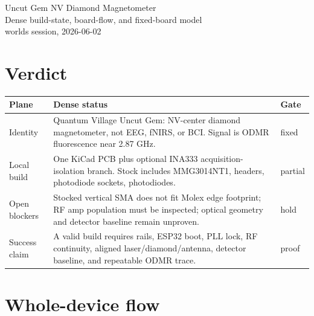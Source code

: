 \documentclass[10pt]{article}
\begin{document}
\begin{center}
{\Large Uncut Gem NV Diamond Magnetometer}\\
{\normalsize Dense build-state, board-flow, and fixed-board model}\\
worlds session, 2026-06-02
\end{center}

\section*{Verdict}

\begin{center}\small
\begin{tabular}{|L{1.1in}|L{4.3in}|L{0.65in}|}
\hline
\textbf{Plane} & \textbf{Dense status} & \textbf{Gate} \\
\hline
Identity & Quantum Village Uncut Gem: NV-center diamond magnetometer, not EEG,
fNIRS, or BCI. Signal is ODMR fluorescence near 2.87 GHz. & fixed \\
\hline
Local build & One KiCad PCB plus optional INA333 acquisition-isolation branch.
Stock includes MMG3014NT1, headers, photodiode sockets, photodiodes. & partial \\
\hline
Open blockers & Stocked vertical SMA does not fit Molex edge footprint; RF amp
population must be inspected; optical geometry and detector baseline remain
unproven. & hold \\
\hline
Success claim & A valid build requires rails, ESP32 boot, PLL lock, RF continuity,
aligned laser/diamond/antenna, detector baseline, and repeatable ODMR trace. & proof \\
\hline
\end{tabular}
\end{center}

\section{Whole-device flow}
\end{document}
